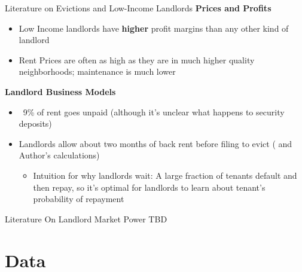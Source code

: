 \documentclass[10pt, xcolor=dvipsnames]{beamer}
\begin{document}
\begin{frame}{Literature on Evictions and Low-Income Landlords}
    \textbf{Prices and Profits}
        \begin{itemize}
                \item Low Income landlords have \textbf{higher} profit margins than any other kind of landlord \parencite{Desmond_2019, Damen_2025, Eisfeldt_2015}
                \item Rent Prices are often as high as they are in much higher quality neighborhoods; maintenance is much lower 
        \end{itemize}
    \pause 
    \textbf{Landlord Business Models}
    \begin{itemize}
        \item ~9\% of rent goes unpaid (although it's unclear what happens to security deposits) \parencite{collinson2024eviction}
        \item Landlords allow about two months of back rent before filing to evict (\cite{collinson2024eviction} and Author's calculations)
        \begin{itemize}
            \item Intuition for why landlords wait: A large fraction of tenants default and then repay, so it's optimal for landlords to learn about tenant's probability of repayment
        \end{itemize}
    \end{itemize}
    
\end{frame}

\begin{frame}{Literature On Landlord Market Power}
TBD
    
\end{frame}


\section{Data}
\end{document}
